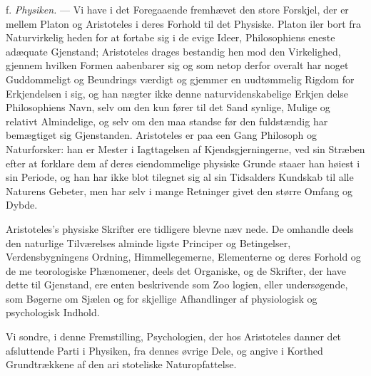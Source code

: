 \documentclass[12pt,a4paper]{book}
\begin{document}
f. \emph{Physiken.} --- Vi have i det Foregaaende fremhævet
den store Forskjel, der er mellem Platon og Aristoteles i deres
Forhold til det Physiske. Platon iler bort fra Naturvirkelig\-%
heden for at fortabe sig i de evige Ideer, Philosophiens eneste
adæquate Gjenstand; Aristoteles drages bestandig hen mod den
Virkelighed, gjennem hvilken Formen aabenbarer sig og som
netop derfor overalt har noget Guddommeligt og Beundrings\-%
værdigt og gjemmer en uudtømmelig Rigdom for Erkjendelsen
i sig, og han nægter ikke denne naturvidenskabelige Erkjen\-%
delse Philosophiens Navn, selv om den kun fører til det Sand\-%
synlige, Mulige og relativt Almindelige, og selv om den maa
standse før den fuldstændig har bemægtiget sig Gjenstanden.
Aristoteles er paa een Gang Philosoph og Naturforsker: han
er Mester i Iagttagelsen af Kjendsgjerningerne, ved sin Stræben
efter at forklare dem af deres eiendommelige physiske Grunde
staaer han høiest i sin Periode, og han har ikke blot tilegnet
sig al sin Tidsalders Kundskab til alle Naturens Gebeter, men
har selv i mange Retninger givet den større Omfang og
Dybde.

Aristoteles's physiske Skrifter ere tidligere blevne næv\-%
nede. De omhandle deels den naturlige Tilværelses alminde\-%
ligste Principer og Betingelser, Verdensbygningens Ordning,
Himmellegemerne, Elementerne og deres Forhold og de me\-%
teorologiske Phænomener, deels det Organiske, og de Skrifter,
der have dette til Gjenstand, ere enten beskrivende som Zoo\-%
logien, eller undersøgende, som Bøgerne om Sjælen og for\-%
skjellige Afhandlinger af physiologisk og psychologisk Indhold.

Vi sondre, i denne Fremstilling, Psychologien, der hos
Aristoteles danner det afsluttende Parti i Physiken, fra dennes
øvrige Dele, og angive i Korthed Grundtrækkene af den ari\-%
stoteliske Naturopfattelse.
\end{document}
